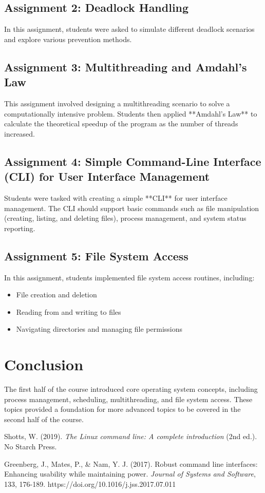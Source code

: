 \documentclass[12pt]{article}
\begin{document}
\subsection{Assignment 2: Deadlock Handling}
In this assignment, students were asked to simulate different deadlock scenarios and explore various prevention methods.

\subsection{Assignment 3: Multithreading and Amdahl's Law}
This assignment involved designing a multithreading scenario to solve a computationally intensive problem. Students then applied **Amdahl's Law** to calculate the theoretical speedup of the program as the number of threads increased.

\subsection{Assignment 4: Simple Command-Line Interface (CLI) for User Interface Management}
Students were tasked with creating a simple **CLI** for user interface management. The CLI should support basic commands such as file manipulation (creating, listing, and deleting files), process management, and system status reporting.

\subsection{Assignment 5: File System Access}
In this assignment, students implemented file system access routines, including:
\begin{itemize}
    \item File creation and deletion
    \item Reading from and writing to files
    \item Navigating directories and managing file permissions
\end{itemize}

\section{Conclusion}
The first half of the course introduced core operating system concepts, including process management, scheduling, multithreading, and file system access. These topics provided a foundation for more advanced topics to be covered in the second half of the course.

\begin{thebibliography}{9}
                Shotts, W. (2019). \textit{The Linux command line: A complete introduction} (2nd ed.). No Starch Press.
    
                Greenberg, J., Mates, P., \& Nam, Y. J. (2017). Robust command line interfaces: Enhancing usability while maintaining power. \textit{Journal of Systems and Software}, 133, 176-189. https://doi.org/10.1016/j.jss.2017.07.011
\end{thebibliography}
\end{document}
